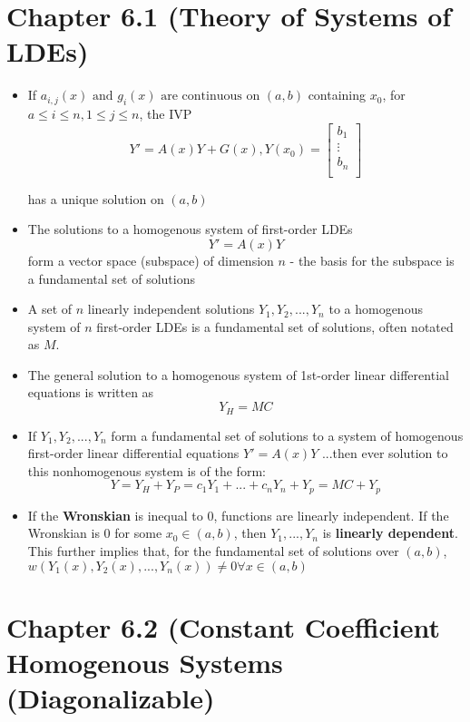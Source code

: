 \documentclass[10pt,letterpaper]{article}
\begin{document}
\section*{Chapter 6.1 (Theory of Systems of LDEs)}

\begin{itemize}
\item If $a_{i,j}(x) \mbox{ and } g_i(x) \mbox{ are continuous on }(a,b)$ containing $x_0$, for $a\leq i \leq n, 1\leq j \leq n$, the IVP 
$$Y'=A(x)Y+G(x), Y(x_0)=\left[
\begin{array}{c}
b_1 \\ 
\vdots  \\ 
b_n \\ 
\end{array}
\right]
 $$
 
has a unique solution on $(a,b)$ 

\item The solutions to a homogenous system of first-order LDEs 
$$Y' = A(x)Y$$ form a vector space (subspace) of dimension $n$ - the basis for the subspace is a fundamental set of solutions 

\item A set of $n$ linearly independent solutions $Y_1, Y_2, ..., Y_n$ to a homogenous system of $n$ first-order LDEs is a fundamental set of solutions, often notated as $M$. %

\item The general solution to a homogenous system of 1st-order linear differential equations is written as 
$$Y_H=MC$$ 

\item If $Y_1, Y_2, ..., Y_n$ form a fundamental set of solutions to a system of homogenous first-order linear differential equations 
$Y'=A(x)Y$
...then ever solution to this nonhomogenous system is of the form: 
$$Y = Y_H + Y_P = c_1Y_1 +...+ c_nY_n+Y_p=MC+Y_p$$

\item If the \textbf{Wronskian} is inequal to 0, functions are linearly independent. If the Wronskian is 0 for some $x_0\in (a,b)$, then $Y_1, ... , Y_n$ is \textbf{linearly dependent}. \\ 
This further implies that, for the fundamental set of solutions over $(a,b)$, $w(Y_1(x), Y_2(x),...,Y_n(x))\neq 0 \forall x\in (a,b)$
\end{itemize}

\section*{Chapter 6.2 (Constant Coefficient Homogenous Systems  (Diagonalizable)}
\end{document}

